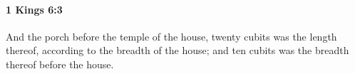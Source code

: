 
		\paragraph{1 Kings 6:3} %
			\label{1KINGS-6-3}

			And the porch before the temple of the house, twenty cubits was the length thereof, according to the breadth of the house; and ten cubits was the breadth thereof before the house.


